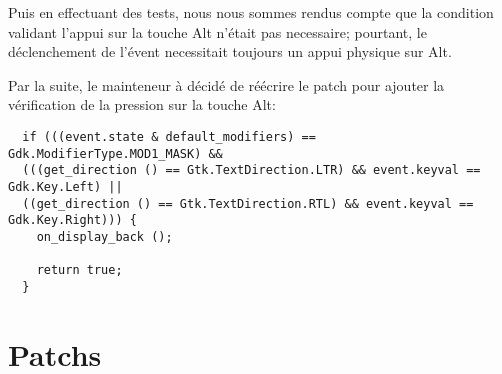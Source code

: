 \documentclass[12pt]{report}
\begin{document}
Puis en effectuant des tests, nous nous sommes rendus compte que la
condition validant l'appui sur la touche Alt n'était pas necessaire;
pourtant, le déclenchement de l'évent necessitait toujours un appui
physique sur Alt.

Par la suite, le mainteneur à décidé de réécrire le patch pour ajouter
la vérification de la pression sur la touche Alt:

\begin{verbatim}
  if (((event.state & default_modifiers) == Gdk.ModifierType.MOD1_MASK) &&
  (((get_direction () == Gtk.TextDirection.LTR) && event.keyval == Gdk.Key.Left) ||
  ((get_direction () == Gtk.TextDirection.RTL) && event.keyval == Gdk.Key.Right))) {
    on_display_back ();

    return true;
  }
\end{verbatim}




\appendix






\chapter{Patchs} 
\end{document}
